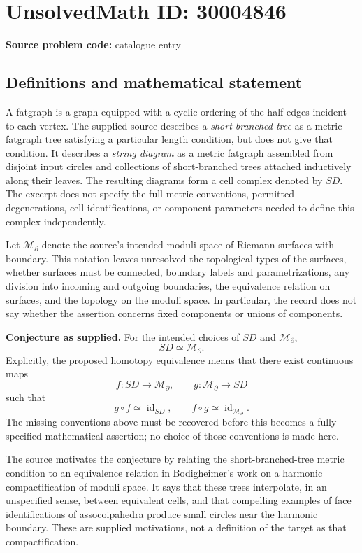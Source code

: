 \documentclass[11pt]{article}
\begin{document}
\section*{UnsolvedMath ID: 30004846}
\textbf{Source problem code:} catalogue entry
\subsection{Definitions and mathematical statement}
A fatgraph is a graph equipped with a cyclic ordering of the half-edges incident to each vertex. The supplied source describes a \emph{short-branched tree} as a metric fatgraph tree satisfying a particular length condition, but does not give that condition. It describes a \emph{string diagram} as a metric fatgraph assembled from disjoint input circles and collections of short-branched trees attached inductively along their leaves. The resulting diagrams form a cell complex denoted by \(SD\). The excerpt does not specify the full metric conventions, permitted degenerations, cell identifications, or component parameters needed to define this complex independently.

Let \(\mathcal M_{\partial}\) denote the source's intended moduli space of Riemann surfaces with boundary. This notation leaves unresolved the topological types of the surfaces, whether surfaces must be connected, boundary labels and parametrizations, any division into incoming and outgoing boundaries, the equivalence relation on surfaces, and the topology on the moduli space. In particular, the record does not say whether the assertion concerns fixed components or unions of components.

\textbf{Conjecture as supplied.} For the intended choices of \(SD\) and \(\mathcal M_{\partial}\),
\[
SD\simeq\mathcal M_{\partial}.
\]
Explicitly, the proposed homotopy equivalence means that there exist continuous maps
\[
f\colon SD\longrightarrow\mathcal M_{\partial},\qquad
 g\colon\mathcal M_{\partial}\longrightarrow SD
\]
such that
\[
g\circ f\simeq\operatorname{id}_{SD},\qquad
f\circ g\simeq\operatorname{id}_{\mathcal M_{\partial}}.
\]
The missing conventions above must be recovered before this becomes a fully specified mathematical assertion; no choice of those conventions is made here.

The source motivates the conjecture by relating the short-branched-tree metric condition to an equivalence relation in Bodigheimer's work on a harmonic compactification of moduli space. It says that these trees interpolate, in an unspecified sense, between equivalent cells, and that compelling examples of face identifications of assocoipahedra produce small circles near the harmonic boundary. These are supplied motivations, not a definition of the target as that compactification.
\end{document}
